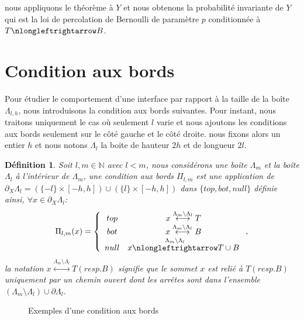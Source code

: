 \documentclass[titlepage,a4paper,12pt]{article}
\newcounter{def}
\newcounter{cor}
\newtheorem{cdb}[def]{Définition}
\begin{document}
nous appliquons le théorème à $Y$ et nous obtenons la probabilité invariante de $Y$ qui est la loi de percolation de Bernoulli de paramètre $p$ conditionnée à $T\nlongleftrightarrow B$.

\section{Condition aux bords}
Pour étudier le comportement d'une interface par rapport à la taille de la boîte $\Lambda_{l,h}$, nous introduisons la condition aux bords suivantes. Pour instant, nous traitons uniquement le cas où seulement $l$ varie et nous ajoutons les conditions aux bords seulement sur le côté gauche et le côté droite. nous fixons alors un entier $h$ et nous notons $\Lambda_l$ la boite de hauteur $2h$ et de longueur $2l$.
\begin{cdb}Soit $l,m\in \mathbb{N}$ avec $l<m$, nous considérons une boîte $\Lambda_m$ et la boîte $\Lambda_l$ à l'intérieur de $\Lambda_m$, une condition aux bords $\Pi_{l,m}$ est une application de $\partial_{X}\Lambda_{l} =(\{-l\}\times[-h,h]) \cup (\{l\}\times [-h,h])$ dans $\{top,bot,null\}$ définie ainsi, $\forall x\in \partial_X\Lambda_{l}$:
$$\Pi_{l,m}(x)=\left\lbrace \begin{array}{cc}
top & x\overset{\Lambda_m \setminus \Lambda_l}{\longleftrightarrow} T\\
bot & x\overset{\Lambda_m \setminus \Lambda_l}{\longleftrightarrow} B\\
null & x\overset{\Lambda_m \setminus \Lambda_l}{\nlongleftrightarrow} T\cup B 
\end{array} \right.,
$$
la notation $x\overset{\Lambda_m \setminus \Lambda_l}{\longleftrightarrow} T(resp. B)$ signifie que le sommet $x$ est relié à $T(resp. B)$ uniquement par un chemin ouvert dont les arrêtes sont dans l'ensemble $(\Lambda_m \setminus \Lambda_l) \cup \partial \Lambda_l$.
\end{cdb}
\begin{figure}[h]
\center
{}
\caption{Exemples d'une condition aux bords}
\end{figure}
\end{document}
